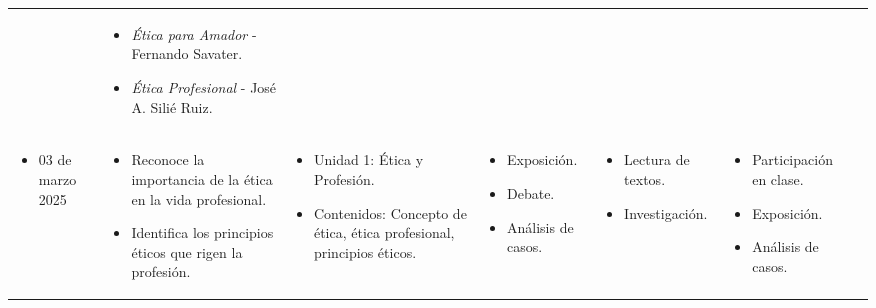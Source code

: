 \begin{landscape}
\begin{xltabular}{\linewidth}{@{}X@{}X@{}X@{}X@{}X@{}X@{}X@{}}
\begin{itemize}
        \end{itemize}                             &
        \begin{itemize}
            \item \textit{Ética para Amador} - Fernando Savater.
            \item \textit{Ética Profesional} - José A. Silié Ruiz.
        \end{itemize}\\
        \begin{itemize}[label={}, left=0pt .. 0pt]
            \item 03 de marzo 2025
        \end{itemize}                                                          &
        \begin{itemize}
            \item Reconoce la importancia de la ética en la vida profesional.
            \item Identifica los principios éticos que rigen la profesión.
        \end{itemize}          &
        \begin{itemize}
            \item Unidad 1: Ética y Profesión.
            \item Contenidos: Concepto de ética, ética profesional, principios éticos.
        \end{itemize} &
        \begin{itemize}
            \item Exposición.
            \item Debate.
            \item Análisis de casos.
        \end{itemize}                             &
        \begin{itemize}
            \item Lectura de textos.
            \item Investigación.
        \end{itemize}                             &
        \begin{itemize}
            \item Participación en clase.
            \item Exposición.
            \item Análisis de casos.
        \end{itemize}                             &

\end{xltabular}
\end{landscape}
